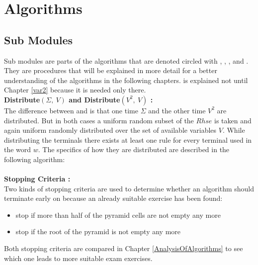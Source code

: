 
\section{Algorithms}\label{algorithms}
\subsection{Sub Modules} \label{subModules}
Sub modules are parts of the algorithms that are denoted circled with , , ,  and . They are procedures that will be explained in more detail for a better understanding of the algorithms in the following chapters.  is explained not until Chapter \ref{var2} because it is needed only there.\\

\noindent \textbf{Distribute$(\Sigma,\ V) $  and Distribute$(V^2,\ V)$ :}\\
The difference between  and  is that one time $\Sigma$ and the other time $V^2$ are distributed. But in both cases a uniform random subset of the $Rhse$ is taken and again uniform randomly distributed over the set of available variables $V$. While distributing the terminals there exists at least one rule for every terminal used in the word $w$. The specifics of how they are distributed are described in the following algorithm: \\

\noindent
{} \\

\noindent \textbf{Stopping Criteria :}\\
Two kinds of stopping criteria are used to determine whether an algorithm should terminate early on because an already suitable exercise has been found:
\begin{itemize}[noitemsep,nolistsep]
	\item stop if more than half of the pyramid cells are not empty any more
	\item stop if the root of the pyramid is not empty any more
\end{itemize}
Both stopping criteria are compared in Chapter \ref{AnalysisOfAlgorithms} to see which one leads to more suitable exam exercises. \\
\pagebreak

